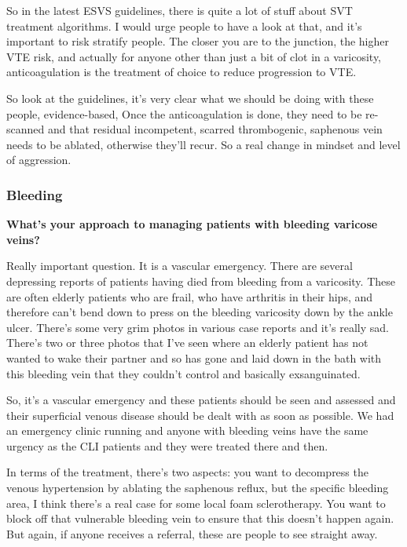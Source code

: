 \documentclass[
]{book}
\begin{document}
So in the latest ESVS guidelines, there is quite a lot of stuff about
SVT treatment algorithms. I would urge people to have a look at that,
and it's important to risk stratify people. The closer you are to the
junction, the higher VTE risk, and actually for anyone other than just a
bit of clot in a varicosity, anticoagulation is the treatment of choice
to reduce progression to VTE.

So look at the guidelines, it's very clear what we should be doing with
these people, evidence-based, Once the anticoagulation is done, they
need to be re-scanned and that residual incompetent, scarred
thrombogenic, saphenous vein needs to be ablated, otherwise they'll
recur. So a real change in mindset and level of aggression.

\hypertarget{bleeding}{%
\subsubsection{Bleeding}\label{bleeding}}

\textbf{What's your approach to managing patients with bleeding varicose
veins?}

Really important question. It is a vascular emergency. There are several
depressing reports of patients having died from bleeding from a
varicosity. These are often elderly patients who are frail, who have
arthritis in their hips, and therefore can't bend down to press on the
bleeding varicosity down by the ankle ulcer. There's some very grim
photos in various case reports and it's really sad. There's two or three
photos that I've seen where an elderly patient has not wanted to wake
their partner and so has gone and laid down in the bath with this
bleeding vein that they couldn't control and basically exsanguinated.

So, it's a vascular emergency and these patients should be seen and
assessed and their superficial venous disease should be dealt with as
soon as possible. We had an emergency clinic running and anyone with
bleeding veins have the same urgency as the CLI patients and they were
treated there and then.

In terms of the treatment, there's two aspects: you want to decompress
the venous hypertension by ablating the saphenous reflux, but the
specific bleeding area, I think there's a real case for some local foam
sclerotherapy. You want to block off that vulnerable bleeding vein to
ensure that this doesn't happen again. But again, if anyone receives a
referral, these are people to see straight away.
\end{document}
